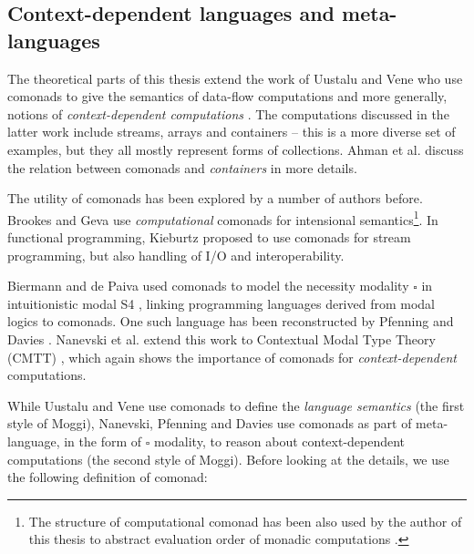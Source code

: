  
\subsection{Context-dependent languages and meta-languages}
\label{sec:path-sem-contextdep}

The theoretical parts of this thesis extend the work of Uustalu and Vene who use comonads
to give the semantics of data-flow computations \cite{comonads-dataflow} and more generally, 
notions of \emph{context-dependent computations} \cite{comonads-notions}. The computations discussed 
in the latter work include streams, arrays and containers -- this is a more diverse set of examples, 
but they all mostly represent forms of collections. Ahman et al. \cite{comonads-containers} discuss
the relation between comonads and \emph{containers} in more details.

The utility of comonads has been explored by a number of authors before. Brookes and Geva
\cite{comonads-computational} use \emph{computational} comonads for intensional semantics\footnote{The
structure of computational comonad has been also used by the author of this thesis to abstract
evaluation order of monadic computations \cite{comonads-malias}.}. In functional programming,
Kieburtz \cite{comonads-and-codata} proposed to use comonads for stream programming, but also 
handling of I/O and interoperability.

Biermann and de Paiva used comonads to model the necessity modality $\square$ in intuitionistic
modal S4 \cite{logic-intuitionistic-modal}, linking programming languages derived from modal
logics to comonads. One such language has been reconstructed by Pfenning and Davies
\cite{logic-modal-reconstruction}. Nanevski et al. extend this work to Contextual Modal Type 
Theory (CMTT) \cite{logic-cmtt}, which again shows the importance of comonads for 
\emph{context-dependent} computations.

While Uustalu and Vene use comonads to define the \emph{language semantics} (the first style
of Moggi), Nanevski, Pfenning and Davies use comonads as part of meta-language, in the form 
of $\square$ modality, to reason about context-dependent computations (the second style of 
Moggi). Before looking at the details, we use the following definition of comonad:


